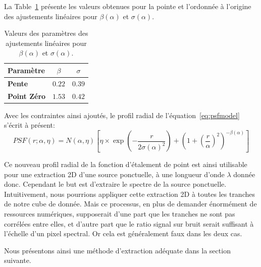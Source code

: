 \documentclass[../main/main.tex]{subfiles}
\begin{document}
La Table~\ref{tab:betasigmapsf} présente les valeurs
obtenues pour la pointe et l'ordonnée à l'origine des ajustements
linéaires pour $\beta(\alpha)$ et $\sigma(\alpha)$. 

\begin{table}[ht]
  \centerfloat
  \renewcommand{\arraystretch}{1.5}
  \caption{Valeurs des paramètres des ajustements linéaires pour
    $\beta(\alpha)$ et $\sigma(\alpha)$.}
  \label{tab:betasigmapsf}
    \begin{threeparttable}
        \begin{tabular}{lcc}
        \toprule
          \textbf{Paramètre} & $\beta$  & $\sigma$ \\
        \midrule
          \textbf{Pente} & $0.22$  &  $0.39$  \\
          \textbf{Point Zéro} & $1.53$  & $0.42$    \\
          
          \bottomrule
        \end{tabular}
    \end{threeparttable}
\end{table}

Avec les contraintes ainsi ajoutés, le profil radial de
l'équation~\ref{eq:psfmodel} s'écrit à présent:
\begin{equation}
  \label{eq:psfmodelconstraint}
  PSF(r; \alpha, \eta) = N(\alpha,\eta)\left[\eta\times\exp\left(- \frac{r}{2\sigma(\alpha)^{2}}\right) +
    \left( 1+\left( \frac{r}{\alpha}\right)^{2}\right)^{-\beta(\alpha)} \right]
\end{equation}

Ce nouveau profil radial de la fonction d'étalement de point est ainsi
utilisable pour une extraction 2D d'une source ponctuelle, à une
longueur d'onde $\lambda$ donnée donc. Cependant le but est d'extraire
le spectre de la source ponctuelle. Intuitivement, nous pourrions
appliquer cette extraction 2D à toutes les tranches de notre cube de
donnée. Mais ce processus, en plus de demander énormément de ressources
numériques, supposerait d'une part que les tranches ne sont pas corrélées
entre elles, et d'autre part que le ratio signal sur bruit serait
suffisant à l'échelle d'un pixel spectral. Or cela est généralement faux
dans les deux cas.

Nous présentons ainsi une méthode d'extraction adéquate dans la section suivante. 
\end{document}
